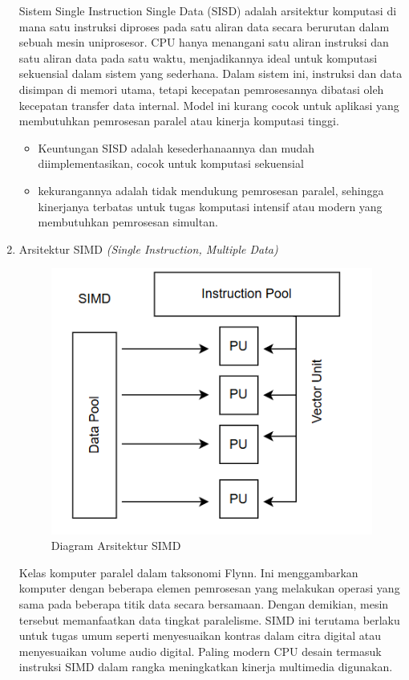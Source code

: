 \documentclass[12pt]{article}
\begin{document}
\begin{enumerate}
      
      Sistem Single Instruction Single Data (SISD) adalah arsitektur komputasi di mana satu instruksi diproses pada satu aliran data secara berurutan dalam sebuah mesin uniprosesor. CPU hanya menangani satu aliran instruksi dan satu aliran data pada satu waktu, menjadikannya ideal untuk komputasi sekuensial dalam sistem yang sederhana. Dalam sistem ini, instruksi dan data disimpan di memori utama, tetapi kecepatan pemrosesannya dibatasi oleh kecepatan transfer data internal. Model ini kurang cocok untuk aplikasi yang membutuhkan pemrosesan paralel atau kinerja komputasi tinggi.

    \begin{itemize}
        \item  Keuntungan  SISD adalah kesederhanaannya dan mudah diimplementasikan, cocok untuk komputasi sekuensial
        \item kekurangannya adalah tidak mendukung pemrosesan paralel, sehingga kinerjanya terbatas untuk tugas komputasi intensif atau modern yang membutuhkan pemrosesan simultan.
    \end{itemize}
    
    \item Arsitektur SIMD \textit{(Single Instruction, Multiple Data)}

        \noindent
        \begin{figure}[H]
            \centering
            \includegraphics[width=0.4\linewidth]{asset/image7.png}
            \caption{Diagram Arsitektur SIMD}
            \label{fig:Diagram-Arsitektur-SIMD}
        \end{figure}
    
    Kelas komputer paralel dalam taksonomi Flynn. Ini menggambarkan komputer dengan beberapa elemen pemrosesan yang melakukan operasi yang sama pada beberapa titik data secara bersamaan. Dengan demikian, mesin tersebut memanfaatkan data tingkat paralelisme. SIMD ini terutama berlaku untuk tugas umum seperti menyesuaikan kontras dalam citra digital atau menyesuaikan volume audio digital. Paling modern CPU desain termasuk instruksi SIMD dalam rangka meningkatkan kinerja multimedia digunakan.


\end{enumerate}
\end{document}
